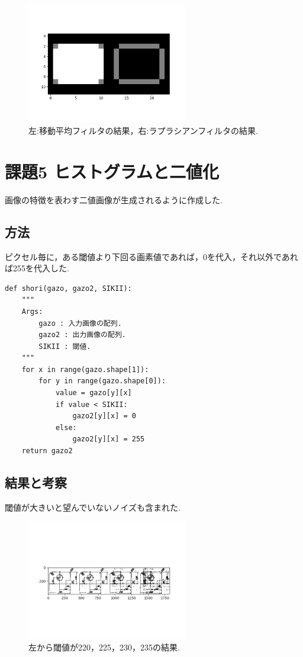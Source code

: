 \documentclass[twocolumn, 10pt,a4j]{jsarticle}
\begin{document}
        \begin{figure}[H]
            \begin{center}
                \includegraphics[width=7cm]{../img/Figure_2.png}
                \caption{左:移動平均フィルタの結果，右:ラプラシアンフィルタの結果.}
            \end{center}
            \end{figure}

\section{課題5 ヒストグラムと二値化}
    画像の特徴を表わす二値画像が生成されるように作成した.
        
    \subsection{方法}
    ピクセル毎に，ある閾値より下回る画素値であれば，0を代入，それ以外であれば255を代入した.

\begin{lstlisting}[caption=kadai5.py, label=p4_txt]
def shori(gazo, gazo2, SIKII):
    """
    Args:
        gazo : 入力画像の配列.
        gazo2 : 出力画像の配列.
        SIKII : 閾値.
    """
    for x in range(gazo.shape[1]):
        for y in range(gazo.shape[0]):
            value = gazo[y][x]
            if value < SIKII:
                gazo2[y][x] = 0
            else:
                gazo2[y][x] = 255
    return gazo2
\end{lstlisting}

    \subsection{結果と考察}
    閾値が大きいと望んでいないノイズも含まれた. 


    \begin{figure}[H]
        \begin{center}
            \includegraphics[width=7cm]{../img/kadai_5.png}
            \caption{左から閾値が220，225，230，235の結果.}
        \end{center}
        \end{figure}
\end{document}
